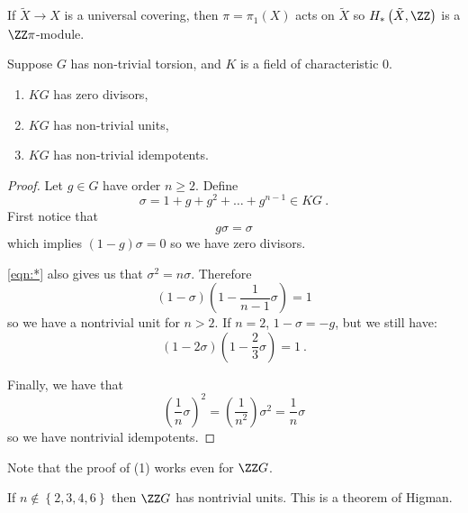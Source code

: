 \begin{rmk}
If $\tilde X\to X$ is a universal covering, then $\pi = \pi_1\left(X\right)$ acts on
$\tilde X$ so $H_*\left(\tilde X , \ZZ\right)$ is a $\ZZ \pi$-module.
\end{rmk}

\begin{thm}
Suppose $G$ has non-trivial torsion, and $K$ is a field of characteristic $0$.
\begin{enumerate}
\item $KG$ has zero divisors,
\item $KG$ has non-trivial units, 
\item $KG$ has non-trivial idempotents.
\end{enumerate}
\label{thm:1.22}
\end{thm}

\begin{proof}
Let $g\in G$ have order $n\geq 2$.
Define 
\begin{equation*}
\sigma = 1 + g + g^2 + \ldots + g^{n-1} \in KG
\ .
\end{equation*}
First notice that
\begin{equation}
g\sigma = \sigma
\label{eqn:*}
\end{equation}
which implies
$\left(1-g\right)\sigma = 0$
so we have zero divisors.

\eqref{eqn:*} also gives us that $\sigma^2 = n\sigma$.
Therefore
\begin{equation*}
\left(1-\sigma\right)\left(1 - \frac{1}{n-1} \sigma\right) = 1
\end{equation*}
so we have a nontrivial unit for $n > 2$. 
If $n = 2$, $1 - \sigma = -g$, but we still have:
\begin{equation}
\left(1 - 2\sigma\right)\left(1 - \frac{2}{3} \sigma\right) = 1 \ .
\end{equation}

Finally, we have that
\begin{equation}
\left(\frac{1}{n} \sigma\right)^2 = \left(\frac{1}{n^2}\right)\sigma^2 = \frac{1}{n}
\sigma
\end{equation}
so we have nontrivial idempotents.
\end{proof}

Note that the proof of (1) works even for $\ZZ G$.

\begin{rmk}
If $n\not\in \left\{2,3,4,6\right\}$ then 
$\ZZ G$ has nontrivial units.
This is a theorem of Higman.
\end{rmk}

